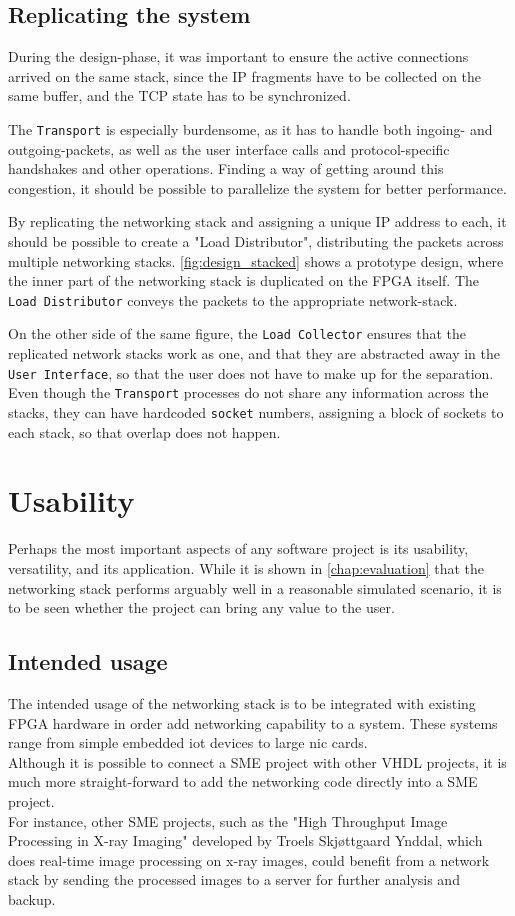 \subsection{Replicating the system}
During the design-phase, it was important to ensure the active connections
arrived on the same stack, since the IP fragments have to be collected on the
same buffer, and the TCP state has to be synchronized.

The \texttt{Transport} is especially burdensome, as it has to handle both
ingoing- and outgoing-packets, as well as the user interface calls and
protocol-specific handshakes and other operations. Finding a way of getting
around this congestion, it should be possible to parallelize the system for
better performance.

By replicating the networking stack and assigning a unique IP address to each, it
should be possible to create a "Load Distributor", distributing the packets
across multiple networking stacks. \autoref{fig:design_stacked} shows a
prototype design, where the inner part of the networking stack is duplicated on
the FPGA itself. The \texttt{Load Distributor} conveys the packets to the
appropriate network-stack.

On the other side of the same figure, the \texttt{Load Collector} ensures that
the replicated network stacks work as one, and that they are abstracted away
in the \texttt{User Interface}, so that the user does not have to make up for
the separation. Even though the \texttt{Transport} processes do not share any
information across the stacks, they can have hardcoded \texttt{socket} numbers,
assigning a block of sockets to each stack, so that overlap does not happen.


\section{Usability}
Perhaps the most important aspects of any software project is its usability,
versatility, and its application.
While it is shown in \autoref{chap:evaluation} that the networking stack
performs arguably well in a reasonable simulated scenario, it is to be seen
whether the project can bring any value to the user.

\subsection{Intended usage}
The intended usage of the networking stack is to be integrated with existing
FPGA hardware in order add networking capability to a system. These systems
range from simple embedded \gls{iot} devices to large \gls{nic} cards.\\
Although it is possible to connect a SME project with other VHDL projects, it
is much more straight-forward to add the networking code directly into a SME
project.\\
For instance, other SME projects, such as the "High Throughput Image Processing in X-ray
Imaging" developed by Troels Skjøttgaard Ynddal\cite{troels}, which does
real-time image processing on x-ray images, could benefit from a network stack
by sending the processed images to a server for further analysis and backup.

